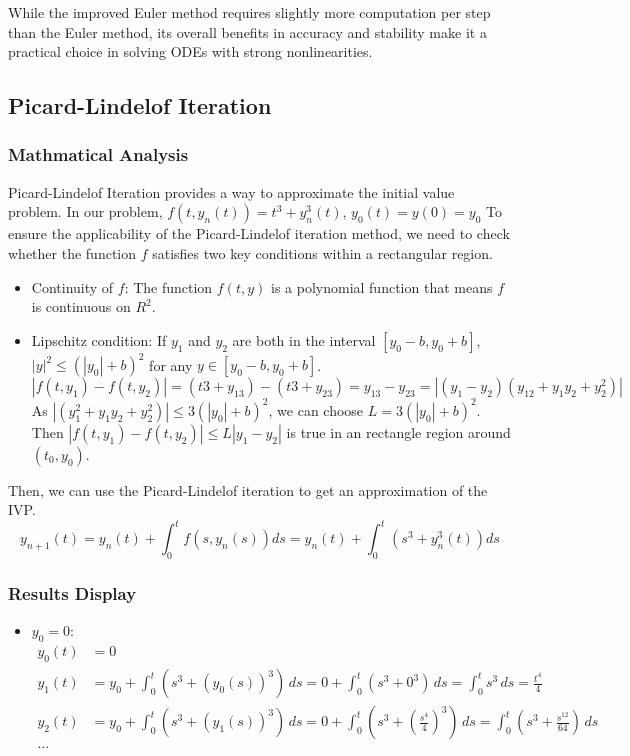 \documentclass{article}
\begin{document}
While the improved Euler method requires slightly more computation per step than the Euler method, its overall benefits in accuracy and stability make it a practical choice in solving ODEs with strong nonlinearities.

\subsection{Picard-Lindelof Iteration}

\subsubsection{Mathmatical Analysis}
Picard-Lindelof Iteration provides a way to approximate the initial value problem. In our problem, $f(t, y_n(t)) = t^3 + y_n^3(t) $, $y_0(t) = y(0)=y_0$
To ensure the applicability of the Picard-Lindelof iteration method, we need to check whether the function $f$ satisfies two key conditions within a rectangular region. 
\begin{itemize}
    \item Continuity of $f$: The function $f(t, y)$ is a polynomial function that means $f$ is continuous on $R^2$. 
    \item Lipschitz condition: If $y_1$ and $y_2$ are both in the interval $ [y_0 - b, y_0 + b] $, $|y|^2 \leq (|y_0|+b)^2$ for any $y \in  [y_0 - b, y_0 + b] $.  
    $$ | f (t, y_1) - f (t, y_2) | = (t3 + y_13) - (t3 + y_23) = y_13-y_23 = | (y_1-y_2) (y_12 + y_1 y_2 + y_2^2) |$$
    As $|(y_1^2 + y_1 y_2 + y_2^2) | \leq 3 (|y_0|+b)^2$, we can choose $L = 3 (|y_0|+b)^2 $. Then $|f(t, y_1) - f(t, y_2)| \leq L |y_1-y_2|$ is true in an rectangle region around $(t_0, y_0)$.
\end{itemize}
Then, we can use the Picard-Lindelof iteration to get an approximation of the IVP. 
$$ y_{n + 1}(t) = y_n(t) + \int_0^t f(s, y_n(s)) ds = y_n(t)+\int_0^t (s^3 + y_n^3(t))  ds$$

\subsubsection{Results Display}


\begin{itemize}
    \item $y_0=0$:
    \begin{align*}
        y_0(t) &= 0 \\
        y_1(t) &= y_0 + \int_0^t (s^3 + (y_0(s))^3) \, ds 
                = 0 + \int_0^t (s^3 + 0^3) \, ds 
                = \int_0^t s^3 \, ds 
                = \frac{t^4}{4} \\
        y_2(t) &= y_0 + \int_0^t (s^3 + (y_1(s))^3) \, ds 
                = 0 + \int_0^t \left( s^3 + \left( \frac{s^4}{4} \right)^3 \right) \, ds 
                = \int_0^t \left( s^3 + \frac{s^{12}}{64} \right) \, ds \\
        \ldots
    \end{align*}
\end{itemize}
\end{document}
